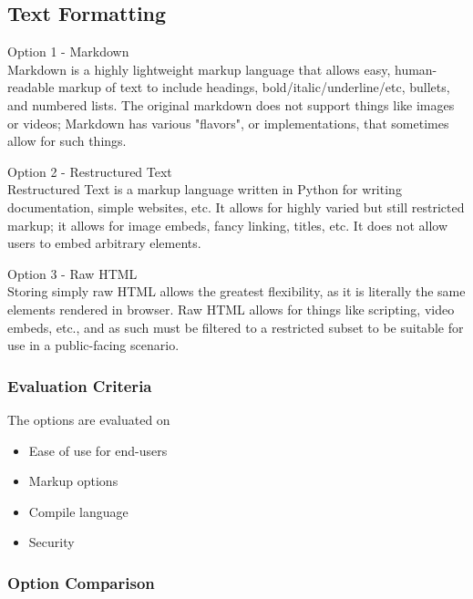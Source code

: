 \documentclass[onecolumn, draftclsnofoot,10pt, compsoc]{IEEEtran}
\begin{document}
{\newpage
\subsection{Text Formatting}

\noindent Option 1 - Markdown \\
\noindent Markdown is a highly lightweight markup language that allows easy, human-readable markup
of text to include headings, bold/italic/underline/etc, bullets, and numbered lists.
 The original markdown does not support things like images or videos; Markdown has various 
 "flavors", or implementations, that sometimes allow for such things. 

\medskip

\noindent Option 2 - Restructured Text \\
\noindent Restructured Text is a markup language written in Python for writing documentation, 
simple websites, etc. It allows for highly varied but still restricted markup; it allows 
for image embeds, fancy linking, titles, etc. It does not allow users to embed arbitrary elements. 

\medskip

\noindent Option 3 - Raw HTML \\
\noindent Storing simply raw HTML allows the greatest flexibility, as it is literally the same elements
rendered in browser. Raw HTML allows for things like scripting, video embeds, etc., and as such must
be filtered to a restricted subset to be suitable for use in a public-facing scenario. 

\medskip
\subsubsection{Evaluation Criteria} 
{\noindent The options are evaluated on

\begin{itemize}
\item Ease of use for end-users
\item Markup options
\item Compile language
\item Security
\end{itemize}

 \par}


\newpage
\subsubsection{Option Comparison} ~\\

}
\end{document}
